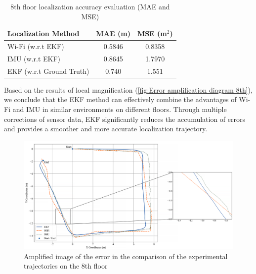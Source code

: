 \documentclass[12pt,a4paper]{article}
\numberwithin{equation}{section}
\begin{document}
\begin{table}[H]
\caption{8th floor localization accuracy evaluation (MAE and MSE)}
\label{tab:8thfloor_error}
\centering
\begin{tabular}{lcc}
\toprule
\textbf{Localization Method} & \textbf{MAE (m)} & \textbf{MSE (m$^2$)} \\
\midrule
Wi-Fi (w.r.t EKF) & 0.5846 & 0.8358 \\
IMU (w.r.t EKF) & 0.8645 & 1.7970 \\
EKF (w.r.t Ground Truth) & 0.740 & 1.551 \\
\bottomrule
\end{tabular}
\end{table}
\noindent Based on the results of local magnification (\autoref{fig:Error amplification diagram 8th}), we conclude that the EKF method can effectively combine the advantages of Wi-Fi and IMU in similar environments on different floors. Through multiple corrections of sensor data, EKF significantly reduces the accumulation of errors and provides a smoother and more accurate localization trajectory.
\begin{figure}[H]
    \centering
    \includegraphics[width=1.1\linewidth]{Amplification images/wifi/half_circle.png}
    \caption{Amplified image of the error in the comparison of the experimental trajectories on the 8th floor}
    \label{fig:Error amplification diagram 8th}
\end{figure}
\end{document}
